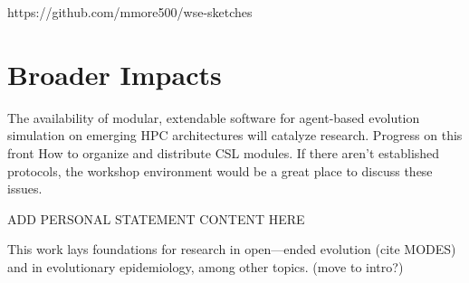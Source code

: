 https://github.com/mmore500/wse-sketches

\section{Broader Impacts}

The availability of modular, extendable software for agent-based evolution simulation on emerging HPC architectures will catalyze research. Progress on this front
How to organize and distribute CSL modules.
If there aren’t established protocols, the workshop environment would be a great place to discuss these issues.

ADD PERSONAL STATEMENT CONTENT HERE

This work lays foundations for research in open—ended evolution (cite MODES) and in evolutionary epidemiology, among other topics. (move to intro?)
